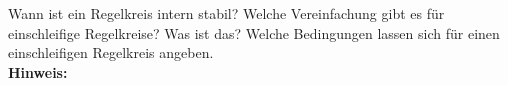 \begin{question}[section=4,name={Interne Stabilität},difficulty=,type=mdl,tags={}]
	Wann ist ein Regelkreis intern stabil? Welche Vereinfachung gibt es für einschleifige Regelkreise? Was ist das? Welche Bedingungen lassen sich für einen einschleifigen Regelkreis angeben.
	\\ \textbf{Hinweis:}\\
	
\end{question}
\begin{solution}
	
\end{solution}